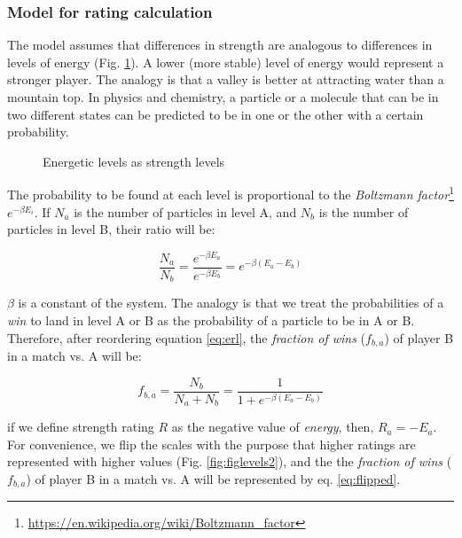 \documentclass[12pt]{article}
\begin{document}
\subsubsection*{Model for rating calculation}

The model assumes that differences in strength are analogous to differences in levels of energy (Fig. \ref{fig:figlevels1}). 
A lower (more stable) level of energy would represent a stronger player.
The analogy is that a valley is better at attracting water than a mountain top. 
In physics and chemistry, a particle or a molecule that can be in two different states can be predicted to be in one or the other with a certain probability.

	\begin{figure}[htb]
	\caption{\label{fig:figlevels1} Energetic levels as strength levels}
	\end{figure}

The probability to be found at each level is proportional to the 
\textit{Boltzmann factor}\footnote{\url{https://en.wikipedia.org/wiki/Boltzmann_factor}} $e^{-\beta E_{i}}$.
If $N_{a}$ is the number of particles in level A, and $N_{b}$ is the number of particles in level B, their ratio will be:

	\begin{equation} \label{eq:erl}
	\frac{N_{a}}{N_{b}} = \frac{ e^{-\beta E_{a}} }{ e^{-\beta E_{b}} } = e^{-\beta(E_{a}-E_{b})}
	\end{equation}

$\beta$ is a constant of the system.
The analogy is that we treat the probabilities of a \textit{win} to land in level A or B as the probability of a particle to be in A or B.
Therefore, after reordering equation \ref{eq:erl}, the \textit{fraction of wins} ($f_{b,a}$) of player B in a match vs. A will be:

	\begin{equation}
	f_{b,a}  = \frac{ N_{b} }{ N_{a}+N_{b} }  =     \frac{1}{1 + e^{-\beta(E_{a}-E_{b})}}  
	\end{equation}

if we define strength rating $R$ as the negative value of \textit{energy}, then, $R_{a} = -E_{a}$.
For convenience, we flip the scales with the purpose that higher ratings are represented with higher values (Fig. \ref{fig:figlevels2}), and the the \textit{fraction of wins} ($f_{b,a}$) of player B in a match vs. A will be represented by eq. \ref{eq:flipped}.
\end{document}

